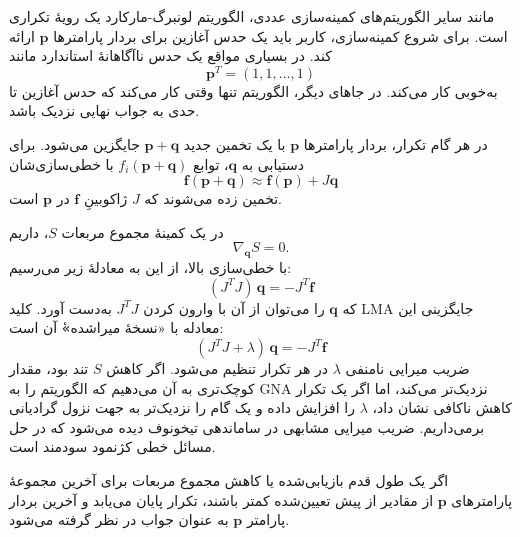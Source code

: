 \documentclass[a4paper, 11pt]{article}
\begin{document}
مانند سایر الگوریتم‌های کمینه‌سازی عددی، الگوریتم لونبرگ-مارکارد یک رویهٔ تکراری است. برای شروع کمینه‌سازی، کاربر باید یک حدس آغازین برای بردار پارامترها
$\mathbf{p}$ ارائه کند. در بسیاری مواقع یک حدس ناآگاهانهٔ استاندارد مانند
\[
\mathbf{p}^{T} = (1,1,\dots,1)
\]
به‌خوبی کار می‌کند. در جاهای دیگر، الگوریتم تنها وقتی کار می‌کند که حدس آغازین تا حدی به جواب نهایی نزدیک باشد.

در هر گام تکرار، بردار پارامترها $\mathbf{p}$ با یک تخمین جدید $\mathbf{p+q}$ جایگزین می‌شود. برای دستیابی به
$\mathbf{q}$، توابع $f_i(\mathbf{p+q})$ با خطی‌سازی‌شان
\[
\mathbf{f(p+q)} \approx \mathbf{f(p)} + J \mathbf{q}
\]
تخمین زده می‌شوند که $J$ ژاکوبینِ $\mathbf{f}$ در $\mathbf{p}$ است.

در یک کمینهٔ مجموع مربعات $S$، داریم
\[
\nabla_{\mathbf{q}} S = 0.
\]
با خطی‌سازی بالا، از این به معادلهٔ زیر می‌رسیم:
\[
(J^{T} J)\,\mathbf{q} = - J^{T} \mathbf{f}
\]
که $\mathbf{q}$ را می‌توان از آن با وارون کردن $J^{T} J$ به‌دست آورد.
کلید LMA جایگزینی این معادله با «نسخهٔ میراشده»ٔ آن است:
\[
(J^{T} J + \lambda)\,\mathbf{q} = - J^{T} \mathbf{f}
\]
ضریب میرایی نامنفی $\lambda$ در هر تکرار تنظیم می‌شود. اگر کاهش $S$
تند بود، مقدار کوچک‌تری به آن می‌دهیم که الگوریتم را به GNA نزدیک‌تر می‌کند،
اما اگر یک تکرار کاهش ناکافی نشان داد، $\lambda$ را افزایش داده و یک گام را
نزدیک‌تر به جهت نزول گرادیانی برمی‌داریم. ضریب میرایی مشابهی در ساماندهی
تیخونوف دیده می‌شود که در حل مسائل خطی کژنمود سودمند است.

اگر یک طول قدم بازیابی‌شده یا کاهش مجموع مربعات برای آخرین مجموعهٔ پارامترهای
$\mathbf{p}$ از مقادیر از پیش تعیین‌شده کمتر باشند، تکرار پایان می‌یابد و آخرین
بردار پارامتر $\mathbf{p}$ به عنوان جواب در نظر گرفته می‌شود.
\end{document}
